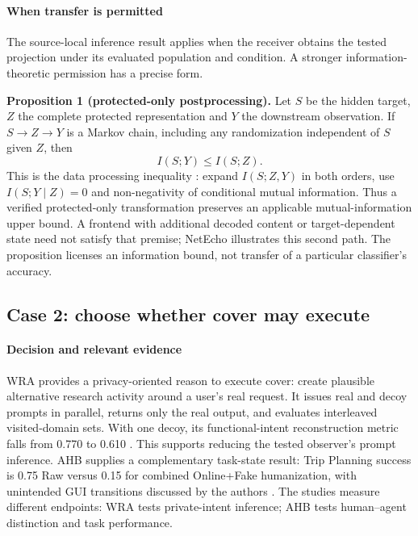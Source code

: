 \paragraph{When transfer is permitted}
The source-local inference result applies when the receiver obtains the tested projection under its evaluated population and condition. A stronger information-theoretic permission has a precise form.

\noindent\textbf{Proposition 1 (protected-only postprocessing).}
Let $S$ be the hidden target, $Z$ the complete protected representation and $Y$ the downstream observation. If $S\to Z\to Y$ is a Markov chain, including any randomization independent of $S$ given $Z$, then
\[
 I(S;Y)\leq I(S;Z).
\]
This is the data processing inequality \cite[Theorem~2.8.1]{cover2006elements}: expand $I(S;Z,Y)$ in both orders, use $I(S;Y\mid Z)=0$ and non-negativity of conditional mutual information. Thus a verified protected-only transformation preserves an applicable mutual-information upper bound. A frontend with additional decoded content or target-dependent state need not satisfy that premise; NetEcho illustrates this second path. The proposition licenses an information bound, not transfer of a particular classifier's accuracy.

\subsection{Case 2: choose whether cover may execute}
\paragraph{Decision and relevant evidence}
WRA provides a privacy-oriented reason to execute cover: create plausible alternative research activity around a user's real request. It issues real and decoy prompts in parallel, returns only the real output, and evaluates interleaved visited-domain sets. With one decoy, its functional-intent reconstruction metric falls from 0.770 to 0.610 \cite{jeong2026wra}. This supports reducing the tested observer's prompt inference. AHB supplies a complementary task-state result: Trip Planning success is 0.75 Raw versus 0.15 for combined Online+Fake humanization, with unintended GUI transitions discussed by the authors \cite{zhu2026turing}. The studies measure different endpoints: WRA tests private-intent inference; AHB tests human--agent distinction and task performance.

